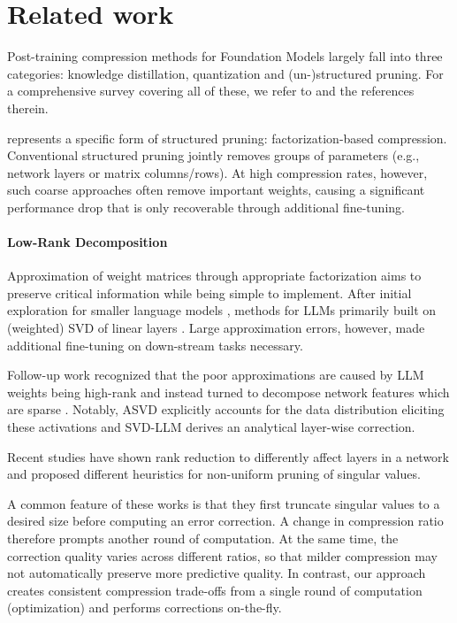 \section{Related work}
\label{sec:related}
Post-training compression methods for Foundation Models largely fall into three categories: knowledge distillation, quantization and (un-)structured pruning. For a comprehensive survey covering all of these, we refer to \cite{zhu_survey_2024} and the references therein.

\methodname represents a specific form of structured pruning: factorization-based compression. Conventional structured pruning \cite{frantar_sparsegpt_2023, xia_sheared_2024, ashkboos_slicegpt_2024} jointly removes groups of parameters (e.g., network layers or matrix columns/rows). At high compression rates, however, such coarse approaches often remove important weights, causing a significant performance drop that is only recoverable through additional fine-tuning.

\paragraph{Low-Rank Decomposition}
Approximation of weight matrices through appropriate factorization aims to preserve critical information while being simple to implement. 
After initial exploration for smaller language models \cite{edalati_kronecker_2022, tahaei_kroneckerbert_2022}, methods for LLMs primarily built on (weighted) SVD of linear layers \cite{ben_noach_compressing_2020, hsuLanguageModelCompression2022}. Large approximation errors, however, made additional fine-tuning on down-stream tasks necessary.

Follow-up work recognized that the poor approximations are caused by LLM weights being high-rank and instead turned to decompose network features which are sparse \cite{kaushal_lord_2023, yu_compressing_2023}. 
Notably, ASVD \cite{yuan_asvd_2024} explicitly accounts for the data distribution eliciting these activations and SVD-LLM \cite{wang_svd-llm_2024} derives an analytical layer-wise correction.

Recent studies \cite{sharma_truth_2023, yuan_asvd_2024, jaiswal_galore_2024} have shown rank reduction to differently affect layers in a network and proposed different heuristics for non-uniform pruning of singular values. 

A common feature of these works is that they first truncate singular values to a desired size before computing an error correction. A change in compression ratio therefore prompts another round of computation. At the same time, the correction quality varies across different ratios, so that milder compression may not automatically preserve more predictive quality. In contrast, our approach creates consistent compression trade-offs from a single round of computation (optimization) and performs corrections on-the-fly.

